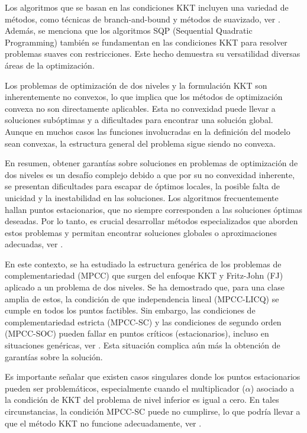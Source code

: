 Los algoritmos que se basan en las condiciones KKT incluyen una variedad de métodos, como técnicas de branch-and-bound y métodos de suavizado, ver \cite{DempeyZemkoho2020}. 
Además, se menciona que los algoritmos SQP (Sequential Quadratic Programming) también se fundamentan en las condiciones KKT para resolver problemas suaves con restricciones. 
Este hecho demuestra su versatilidad diversas áreas de la optimización.

Los problemas de optimización de dos niveles y la formulación KKT son inherentemente no convexos, lo que implica que los métodos de optimización convexa no son directamente aplicables. Esta no convexidad puede llevar a soluciones subóptimas y a dificultades para encontrar una solución global. 
Aunque en muchos casos las funciones involucradas en la definición del modelo sean convexas, la estructura general del problema sigue siendo no convexa.

En resumen, obtener garantías sobre soluciones en problemas de optimización de dos niveles es un desafío complejo debido a que por su no convexidad inherente, se presentan dificultades para escapar de óptimos locales, la posible falta de unicidad y la inestabilidad en las soluciones. Los algoritmos frecuentemente hallan puntos estacionarios, que no siempre corresponden a las soluciones óptimas deseadas. Por lo tanto, es crucial desarrollar métodos especializados que aborden estos problemas y permitan encontrar soluciones globales o aproximaciones adecuadas, ver \cite{DempeyZemkoho2020}.

En este contexto, se ha estudiado la estructura genérica de los problemas de complementariedad (MPCC) que surgen del enfoque KKT y Fritz-John (FJ) aplicado a un problema de dos niveles. Se ha demostrado que, para una clase amplia de estos, la condición de que independencia lineal (MPCC-LICQ) se cumple en todos los puntos factibles. Sin embargo, las condiciones de complementariedad estricta (MPCC-SC) y las condiciones de segundo orden (MPCC-SOC) pueden fallar en puntos críticos (estacionarios), incluso en situaciones genéricas, ver \cite{Allende2012SolvingBP}. Esta situación complica aún más la obtención de garantías sobre la solución.

Es importante señalar que existen casos singulares donde los puntos estacionarios pueden ser problemáticos, especialmente cuando el multiplicador (\(\alpha\)) asociado a la condición de KKT del problema de nivel inferior es igual a cero. En tales circunstancias, la condición MPCC-SC puede no cumplirse, lo que podría llevar a que el método KKT no funcione adecuadamente, ver \cite{Allende2012SolvingBP}.

